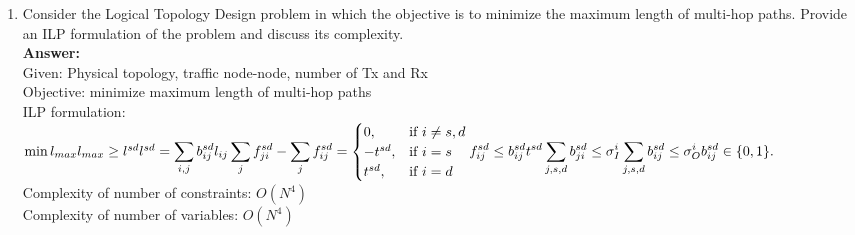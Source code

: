 \documentclass[a4paper]{article}
\begin{document}
\begin{enumerate}
\item Consider the Logical Topology Design problem in which the objective is to minimize the maximum length of multi-­hop paths. Provide an ILP formulation of the problem and discuss its complexity.\\
\textbf{Answer:}\\
Given: Physical topology, traffic node-node, number of Tx and Rx\\
Objective: minimize maximum length of multi-hop paths\\
ILP formulation:\\
\begin{math}
\min l_{max} \\
l_{max} \ge l^{sd} \\
l^{sd} = \displaystyle\sum\limits_{i,j} {b_{ij}^{sd}l_{ij}}\\
\displaystyle\sum\limits_{j} {f_{ji}^{sd}} - \displaystyle\sum\limits_{j} {f_{ij}^{sd}} =
  \begin{cases}
  0, &\text{if $i \neq s, d$}\\
  -t^{sd}, &\text{if $i = s$}\\
  t^{sd}, &\text{if $i = d$}
  \end{cases} \\
f_{ij}^{sd} \le b_{ij}^{sd}t^{sd}\\
\displaystyle\sum\limits_{j,s,d} {b_{ji}^{sd}} \le \sigma_{I}^{i} \\
\displaystyle\sum\limits_{j,s,d} {b_{ij}^{sd}} \le \sigma_{O}^{i} \\
b_{ij}^{sd} \in \{0,1\}.
\end{math}\\
Complexity of number of constraints: $O(N^4)$ \\
Complexity of number of variables: $O(N^4)$ 


\end{enumerate}
\end{document}
